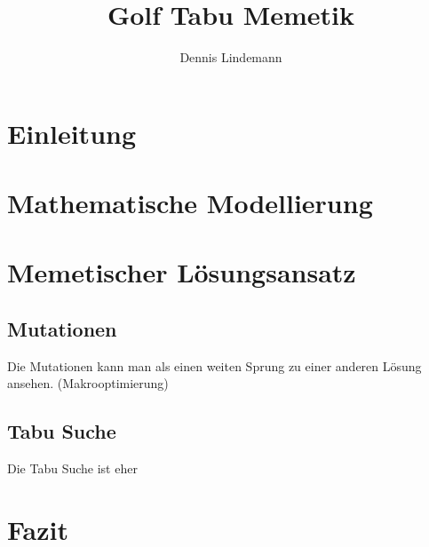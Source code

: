 \documentclass[draft]{tcs-seminar}
\begin{document}
\title{Golf Tabu Memetik}
\author{Dennis Lindemann}

\begin{abstract}

\end{abstract}

\maketitle


\section{Einleitung}
  


\section{Mathematische Modellierung}
    
\section{Memetischer Lösungsansatz}
  \subsection{Mutationen}
    Die Mutationen kann man als einen weiten Sprung zu einer anderen Lösung ansehen. (Makrooptimierung)
  \subsection{Tabu Suche}
    Die Tabu Suche ist eher





\section{Fazit}


\begin{thebibliography}{9}  
    
\end{thebibliography}
\end{document}
